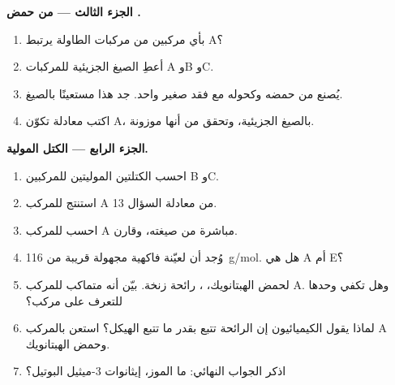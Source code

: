 \begin{problem}
\medskip
\noindent\textbf{الجزء الثالث --- من حمض .}
\begin{enumerate}[resume]
  \item بأي مركبين من مركبات الطاولة يرتبط A؟
  \item أعطِ الصيغ الجزيئية للمركبات A وB وC.
  \item يُصنع  من حمضه وكحوله مع فقد  صغير
        واحد. جد هذا  مستعينًا بالصيغ.
  \item اكتب معادلة تكوّن A، بالصيغ الجزيئية،
        وتحقق من أنها موزونة.
\end{enumerate}

\medskip
\noindent\textbf{الجزء الرابع --- الكتل المولية.}
\begin{enumerate}[resume]
  \item احسب الكتلتين الموليتين للمركبين B وC.
  \item استنتج  للمركب A من معادلة السؤال 13.
  \item احسب  للمركب A مباشرة من صيغته،
        وقارن.
  \item وُجد أن لعيّنة فاكهية مجهولة  قريبة من
        \qty{116}{g/mol}. هل هي A أم E؟
  \item لحمض الهبتانويك، ، رائحة زنخة. بيّن أنه
        متماكب للمركب A. وهل تكفي  وحدها للتعرف على مركب؟
  \item لماذا يقول الكيميائيون إن الرائحة تتبع  بقدر ما تتبع
        الهيكل؟ استعن بالمركب A وحمض الهبتانويك.
  \item اذكر الجواب النهائي: ما   الموز،
        إيثانوات 3-ميثيل البوتيل؟
\end{enumerate}
\end{problem}
